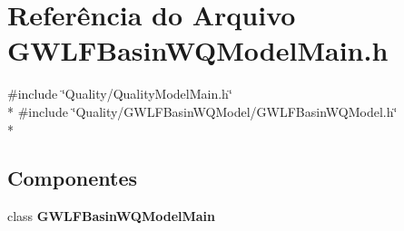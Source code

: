 \section{Referência do Arquivo G\+W\+L\+F\+Basin\+W\+Q\+Model\+Main.\+h}
\label{_g_w_l_f_basin_w_q_model_main_8h}
{\ttfamily \#include \char`\"{}Quality/\+Quality\+Model\+Main.\+h\char`\"{}}\\*
{\ttfamily \#include \char`\"{}Quality/\+G\+W\+L\+F\+Basin\+W\+Q\+Model/\+G\+W\+L\+F\+Basin\+W\+Q\+Model.\+h\char`\"{}}\\*
\subsection*{Componentes}
\begin{DoxyCompactItemize}
\item 
class {\bf G\+W\+L\+F\+Basin\+W\+Q\+Model\+Main}
\end{DoxyCompactItemize}
